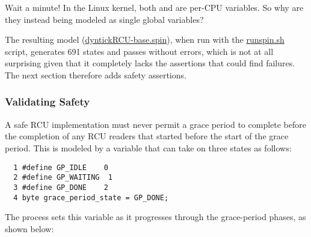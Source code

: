 \QuickQuiz{}
	Wait a minute!
	In the Linux kernel, both  and
	 are per-CPU variables.
	So why are they instead being modeled as single global variables?
 \QuickQuizEnd

The resulting model (\url{dyntickRCU-base.spin}),
when run with the
\url{runspin.sh} script,
generates 691 states and
passes without errors, which is not at all surprising given that
it completely lacks the assertions that could find failures.
The next section therefore adds safety assertions.

\subsubsection{Validating Safety}
\label{app:formal:Validating Safety}

A safe RCU implementation must never permit a grace period to
complete before the completion of any RCU readers that started
before the start of the grace period.
This is modeled by a  variable that
can take on three states as follows:

\vspace{5pt}
\begin{minipage}[t]{\columnwidth}
\begin{verbatim}
  1 #define GP_IDLE    0
  2 #define GP_WAITING  1
  3 #define GP_DONE    2
  4 byte grace_period_state = GP_DONE;
\end{verbatim}
\end{minipage}
\vspace{5pt}

The  process sets this variable as it
progresses through the grace-period phases, as shown below:

